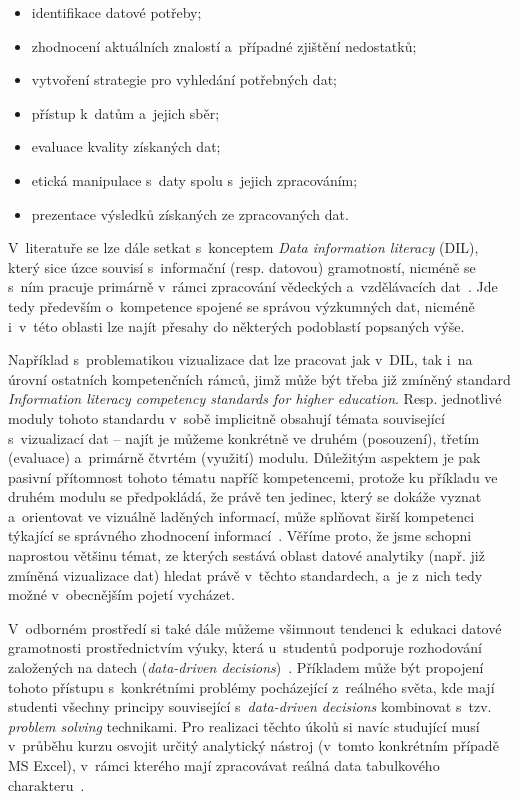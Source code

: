 \begin{itemize}
\tightlist
\item
  identifikace datové potřeby;
\item
  zhodnocení aktuálních znalostí a~případné zjištění nedostatků;
\item
  vytvoření strategie pro vyhledání potřebných dat;
\item
  přístup k~datům a~jejich sběr;
\item
  evaluace kvality získaných dat;
\item
  etická manipulace s~daty spolu s~jejich zpracováním;
\item
  prezentace výsledků získaných ze zpracovaných dat.
\end{itemize}

V~literatuře se lze dále setkat s~konceptem \emph{Data information literacy} (DIL), který sice úzce souvisí s~informační (resp. datovou) gramotností, nicméně se s~ním pracuje primárně v~rámci zpracování vědeckých a~vzdělávacích dat~\parencite{jeffryes13}. Jde tedy především o~kompetence spojené se správou výzkumných dat, nicméně i~v~této oblasti lze najít přesahy do některých podoblastí popsaných výše.

Například s~problematikou vizualizace dat lze pracovat jak v~DIL, tak i~na úrovní ostatních kompetenčních rámců, jimž může být třeba již zmíněný standard \emph{Information literacy competency standards for higher education}. Resp. jednotlivé moduly tohoto standardu v~sobě implicitně obsahují témata související s~vizualizací dat -- najít je můžeme konkrétně ve druhém (posouzení), třetím (evaluace) a~primárně čtvrtém (využití) modulu. Důležitým aspektem je pak pasivní přítomnost tohoto tématu napříč kompetencemi, protože ku příkladu ve druhém modulu se předpokládá, že právě ten jedinec, který se dokáže vyznat a~orientovat ve vizuálně laděných informací, může splňovat širší kompetenci týkající se správného zhodnocení informací~\parencite{womack14}. Věříme proto, že jsme schopni naprostou většinu témat, ze kterých sestává oblast datové analytiky (např. již zmíněná vizualizace dat) hledat právě v~těchto standardech, a~je z~nich tedy možné v~obecnějším pojetí vycházet.

V~odborném prostředí si také dále můžeme všimnout tendenci k~edukaci datové gramotnosti prostřednictvím výuky, která u~studentů podporuje rozhodování založených na datech (\emph{data-driven decisions})~\parencite{mandinach13}. Příkladem může být propojení tohoto přístupu s~konkrétními problémy pocházející z~reálného světa, kde mají studenti všechny principy související s~\emph{data-driven decisions} kombinovat s~tzv. \emph{problem solving} technikami. Pro realizaci těchto úkolů si navíc studující musí v~průběhu kurzu osvojit určitý analytický nástroj (v~tomto konkrétním případě MS Excel), v~rámci kterého mají zpracovávat reálná data tabulkového charakteru~\parencite{slayter17}.

